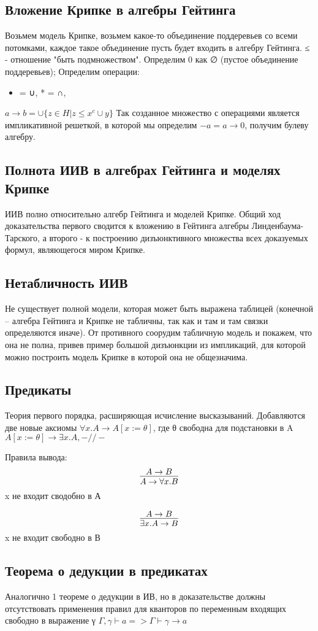 \documentclass[12pt]{article}
\begin{document}
\subsection{Вложение Крипке в алгебры Гейтинга}
\label{sec-2-12}
Возьмем модель Крипке, возьмем какое-то объединение поддеревьев
со всеми потомками, каждое такое объединение пусть будет входить
в алгебру Гейтинга. ≤ - отношение "быть подмножеством".
Определим 0 как ∅ (пустое объединение поддеревьев);
Определим операции:
\begin{itemize}
\item = ∪, * = ∩,
\end{itemize}
$a \to b = ∪\{z \in H | z ≤ x^c ∪ y\}$
Так созданное множество с операциями является импликативной
решеткой, в которой мы определим $-a = a \to 0$, получим булеву алгебру.
\subsection{Полнота ИИВ в алгебрах Гейтинга и моделях Крипке}
\label{sec-2-13}
ИИВ полно относительно алгебр Гейтинга и моделей Крипке.
Общий ход доказательства первого сводится к вложению
в Гейтинга алгебры Линденбаума-Тарского, а второго -
к построению дизъюнктивного множества всех доказуемых
формул, являющегося миром Крипке.
\subsection{Нетабличность ИИВ}
\label{sec-2-14}
Не существует полной модели, которая может быть выражена таблицей
(конечной – алгебра Гейтинга и Крипке не табличны, так как и там и
там связки определяются иначе).
От противного соорудим табличную модель и покажем, что она не полна,
привев пример большой дизъюнкции из импликаций, для которой можно
построить модель Крипке в которой она не общезначима.
\subsection{Предикаты}
\label{sec-2-15}
Теория первого порядка, расширяющая исчисление высказываний.
Добавляются две новые аксиомы
$∀x.A \to A[x:=θ]$, где θ свободна для подстановки в A
$A[x:=θ] \to \exists x.A, -//-$

Правила вывода:
\[\infer{A \to \forall x . B}{A \to B}\]
 x не входит сводобно в А

\[\infer{\exists x . A \to B}{A \to B}\]
 x не входит свободно в В
\subsection{Теорема о дедукции в предикатах}
\label{sec-2-16}
Аналогично 1 теореме о дедукции в ИВ, но в доказательстве должны
отсутствовать применения правил для кванторов по переменным входящих
свободно в выражение γ
$Γ, γ \vdash a => Γ \vdash γ \to a$
\end{document}
